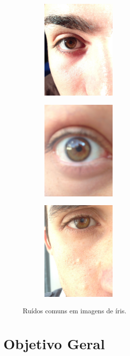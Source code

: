 \begin{figure}[h!]
\begin{subfigure}{.3\textwidth}
\centering
\includegraphics[width=4cm,height=5cm]{img/Resultados/miche/ruidosa.jpg}
\end{subfigure}\hfill
\begin{subfigure}{.3\textwidth}
\centering
\includegraphics[width=4cm,height=5cm]{img/Resultados/miche/003_IP5_OU_R_RI_01_3.jpg}
\end{subfigure}\hfill
\begin{subfigure}{.3\textwidth}
\centering
\includegraphics[width=4cm,height=5cm]{img/Resultados/miche/034_IP5_OU_R_RI_01_1.jpg}
\end{subfigure}
\caption{Ruídos comuns em imagens de íris.}
\label{fig:intro:ruidos}
\end{figure}

\section{Objetivo Geral}

